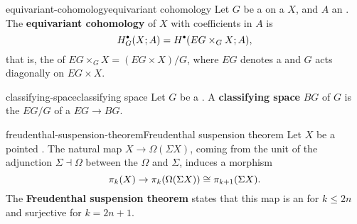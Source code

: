 \begin{topic}{equivariant-cohomology}{equivariant cohomology}
    Let $G$ be a   on a  $X$, and $A$ an . The \textbf{equivariant cohomology} of $X$ with coefficients in $A$ is
    \[ H_G^\bdot(X; A) = H^\bdot(EG \times_G X; A), \]
    that is, the  of $EG \times_G X = (EG \times X) / G$, where $EG$ denotes a  and $G$ acts diagonally on $EG \times X$.
\end{topic}

\begin{topic}{classifying-space}{classifying space}
    Let $G$ be a . A \textbf{classifying space} $BG$ of $G$ is the  $EG/G$ of a  $EG \to BG$.
\end{topic}

\begin{topic}{freudenthal-suspension-theorem}{Freudenthal suspension theorem}
    Let $X$ be a pointed  . The natural map $X \to \Omega (\Sigma X)$, coming from the unit of the adjunction $\Sigma \dashv \Omega$ between the  $\Omega$ and  $\Sigma$, induces a morphism
    \[ \pi_k(X) \to \pi_k(\Omega(\Sigma X)) \cong \pi_{k + 1}(\Sigma X) . \]
    The \textbf{Freudenthal suspension theorem} states that this map is an  for $k \le 2n$ and surjective for $k = 2n + 1$.
\end{topic}
